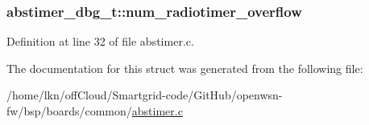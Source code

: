 \subsubsection[{\texorpdfstring{num\+\_\+radiotimer\+\_\+overflow}{num_radiotimer_overflow}}]{ abstimer\+\_\+dbg\+\_\+t\+::num\+\_\+radiotimer\+\_\+overflow}\hypertarget{structabstimer__dbg__t_a9c8f94ef8ac20c0c5e1da1126c0c233a}{}\label{structabstimer__dbg__t_a9c8f94ef8ac20c0c5e1da1126c0c233a}


Definition at line 32 of file abstimer.\+c.



The documentation for this struct was generated from the following file\+:\begin{DoxyCompactItemize}
\item 
/home/lkn/off\+Cloud/\+Smartgrid-\/code/\+Git\+Hub/openwsn-\/fw/bsp/boards/common/\hyperlink{abstimer_8c}{abstimer.\+c}\end{DoxyCompactItemize}
